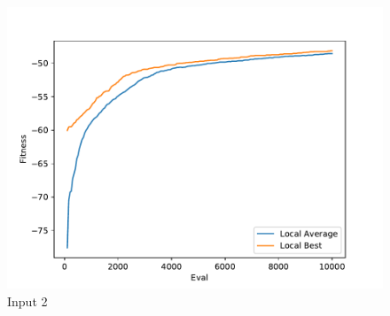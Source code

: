 \documentclass{standalone}
\begin{document}
\begin{figure}[!htb]
	\caption{Input 2}
	\label{fig:graph_2006}
	\includegraphics[width=\textwidth]{../graphs/graphs/2006.pdf}
\end{figure}
\end{document}
